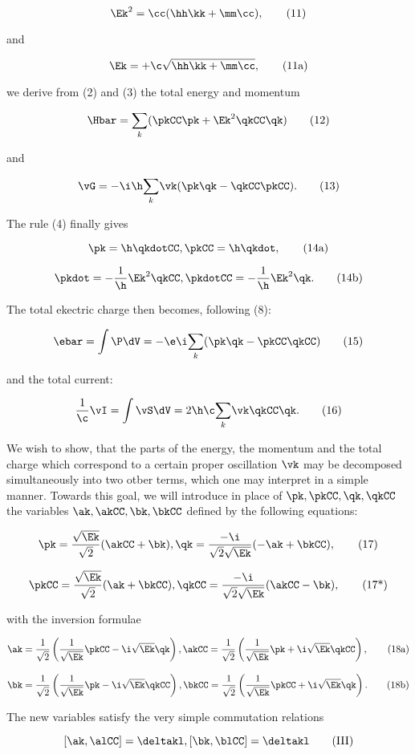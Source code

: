 \documentclass{article}
\newcommand{\inv}[1]{\frac{1}{#1}}
\newcommand{\commutator}[2]{\left[ #1, #2 \right]}
\newcommand{\sumk}{\underset{k}{\sum}}
\newcommand{\nequ}[2]{
\begin{equation*}
#1
\tag{#2}
\end{equation*}
}
\begin{document}
\nequ{
\Ek^2 = \cc(\hh\kk + \mm\cc),
}{11}

and

\nequ{
\Ek = +\c\sqrt{\hh\kk + \mm\cc},
}{11a}

we derive from (2) and (3) the total energy and momentum

\nequ{
\Hbar = \sumk(\pkCC\pk + \Ek^2\qkCC\qk)
}{12}

and

\nequ{
\vG = -\i\h\sumk\vk(\pk\qk - \qkCC\pkCC).
}{13}

The rule (4) finally gives

\nequ{
\pk = \h\qkdotCC, \pkCC = \h\qkdot,
}{14a}

\nequ{
\pkdot = -\inv{\h}\Ek^2\qkCC, \pkdotCC = -\inv{\h}\Ek^2\qk.
}{14b}

The total ekectric charge then becomes, following (8):

\nequ{
\ebar = \int\P\dV = -\e\i\sumk(\pk\qk - \pkCC\qkCC)
}{15}

and the total current:

\nequ{
\inv{\c}\vI = \int\vS\dV = 2\h\c\sumk\vk\qkCC\qk.
}{16}

We wish to show, that the parts of the energy, the momentum and the total charge which correspond to a certain proper oscillation $\vk$ may be decomposed simultaneously into two otber terms, which one may interpret in a simple manner. Towards this goal, we will introduce in place of $\pk, \pkCC, \qk, \qkCC$ the variables $\ak, \akCC, \bk, \bkCC$ defined by the following equations:

\nequ{
\pk = \frac{\sqrt{\Ek}}{\sqrt{2}}(\akCC + \bk), \qk = \frac{-\i}{\sqrt{2}\sqrt{\Ek}}(-\ak +\bkCC),
}{17}

\nequ{
\pkCC = \frac{\sqrt{\Ek}}{\sqrt{2}}(\ak + \bkCC), \qkCC = \frac{-\i}{\sqrt{2}\sqrt{\Ek}}(\akCC - \bk),
}{17*}

with the inversion formulae

\nequ{
\ak = \inv{\sqrt{2}}\left( \inv{\sqrt{\Ek}}\pkCC - \i\sqrt{\Ek}\qk\right),
\akCC = \inv{\sqrt{2}}\left( \inv{\sqrt{\Ek}}\pk + \i\sqrt{\Ek}\qkCC\right),
}{18a}

\nequ{
\bk = \inv{\sqrt{2}}\left( \inv{\sqrt{\Ek}}\pk - \i\sqrt{\Ek}\qkCC\right),
\bkCC = \inv{\sqrt{2}}\left( \inv{\sqrt{\Ek}}\pkCC + \i\sqrt{\Ek}\qk\right).
}{18b}

The new variables satisfy the very simple commutation relations

\nequ{
\commutator{\ak}{\alCC} = \deltakl,
\commutator{\bk}{\blCC} = \deltakl
}{III}
\end{document}
